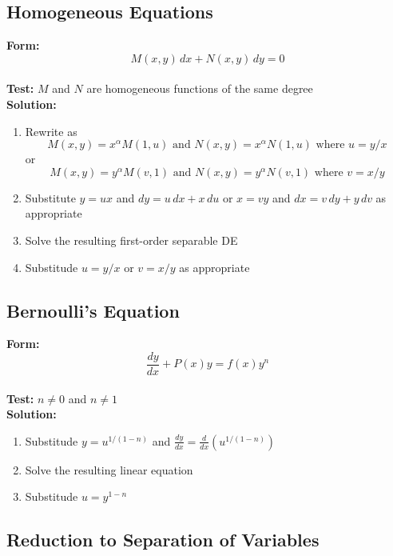 \documentclass{article}
\begin{document}
\subsection{Homogeneous Equations}

\textbf{Form:} \[M(x, y) \,d x + N(x, y) \,d y = 0\] \\ \textbf{Test:} $M$ and $N$ are homogeneous functions of the same degree \\ \textbf{Solution:}

\begin{enumerate}
  \item Rewrite as \[M(x, y) = x^\alpha M(1, u) \text{ and } N(x, y) = x^\alpha N(1, u) \text{ where } u = y / x\] or \[M(x, y) = y^\alpha M(v, 1) \text{ and } N(x, y) = y^\alpha N(v, 1) \text{ where } v = x / y\]

  \item Substitute $y = u x$ and $d y = u \,d x + x \,d u$ or $x = v y$ and $d x = v \,d y + y \,d v$ as appropriate

  \item Solve the resulting first-order separable DE

  \item Substitude $u = y / x$ or $v = x / y$ as appropriate
\end{enumerate}

\subsection{Bernoulli's Equation}

\textbf{Form:} \[\frac{d y}{d x} + P(x) y = f(x) y^n\] \\ \textbf{Test:} $n \ne 0$ and $n \ne 1$ \\ \textbf{Solution:}

\begin{enumerate}
  \item Substitude $y = u^{1 / (1 - n)}$ and $\frac{d y}{d x} = \frac{d}{dx} (u^{1 / (1 - n)})$

  \item Solve the resulting linear equation

  \item Substitude $u = y^{1 - n}$
\end{enumerate}

\subsection{Reduction to Separation of Variables}
\end{document}
